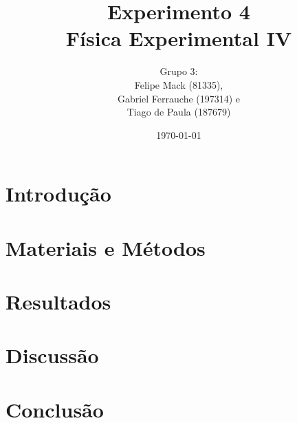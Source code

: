 \documentclass[a4paper,portuguese,utf8,T1]{article}
\title{
	\Huge Experimento 4 			\\
    \Large Física Experimental IV
}
\author{
	\small Grupo 3:					\\
	Felipe Mack (81335),			\\
    Gabriel Ferrauche (197314) e	\\
    Tiago de Paula (187679)
}
\date{\small\today}
\begin{document}
	\maketitle

	\begin{abstract}
    	\textit{}
	\end{abstract}

	\section{Introdução} \label{introducao}
		

	\section{Materiais e Métodos} \label{metodos}
    	

	\section{Resultados} \label{resultados}
	 	

	\section{Discussão} \label{discussao}
    	

    \section{Conclusão} \label{conclusao}
    	

    \printbibliography
\end{document}
